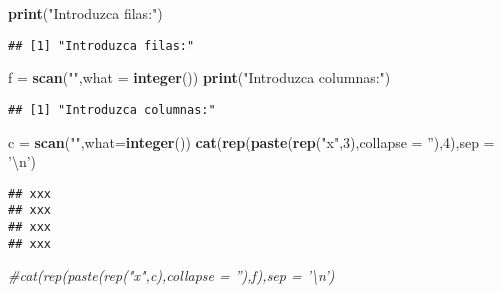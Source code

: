 \documentclass[]{article}
\newenvironment{Shaded}{\begin{snugshade}}{\end{snugshade}}
\newcommand{\KeywordTok}[1]{\textcolor[rgb]{0.13,0.29,0.53}{\textbf{#1}}}
\newcommand{\DataTypeTok}[1]{\textcolor[rgb]{0.13,0.29,0.53}{#1}}
\newcommand{\DecValTok}[1]{\textcolor[rgb]{0.00,0.00,0.81}{#1}}
\newcommand{\CharTok}[1]{\textcolor[rgb]{0.31,0.60,0.02}{#1}}
\newcommand{\StringTok}[1]{\textcolor[rgb]{0.31,0.60,0.02}{#1}}
\newcommand{\CommentTok}[1]{\textcolor[rgb]{0.56,0.35,0.01}{\textit{#1}}}
\newcommand{\NormalTok}[1]{#1}
\begin{document}
\begin{Shaded}
\begin{Highlighting}[]
\KeywordTok{print}\NormalTok{(}\StringTok{"Introduzca filas:"}\NormalTok{)}
\end{Highlighting}
\end{Shaded}

\begin{verbatim}
## [1] "Introduzca filas:"
\end{verbatim}

\begin{Shaded}
\begin{Highlighting}[]
\NormalTok{f =}\StringTok{ }\KeywordTok{scan}\NormalTok{(}\StringTok{""}\NormalTok{,}\DataTypeTok{what =} \KeywordTok{integer}\NormalTok{())}
\KeywordTok{print}\NormalTok{(}\StringTok{"Introduzca columnas:"}\NormalTok{)}
\end{Highlighting}
\end{Shaded}

\begin{verbatim}
## [1] "Introduzca columnas:"
\end{verbatim}

\begin{Shaded}
\begin{Highlighting}[]
\NormalTok{c =}\StringTok{ }\KeywordTok{scan}\NormalTok{(}\StringTok{""}\NormalTok{,}\DataTypeTok{what=}\KeywordTok{integer}\NormalTok{())}
\KeywordTok{cat}\NormalTok{(}\KeywordTok{rep}\NormalTok{(}\KeywordTok{paste}\NormalTok{(}\KeywordTok{rep}\NormalTok{(}\StringTok{"x"}\NormalTok{,}\DecValTok{3}\NormalTok{),}\DataTypeTok{collapse =} \StringTok{''}\NormalTok{),}\DecValTok{4}\NormalTok{),}\DataTypeTok{sep =} \StringTok{'}\CharTok{\textbackslash{}n}\StringTok{'}\NormalTok{)}
\end{Highlighting}
\end{Shaded}

\begin{verbatim}
## xxx
## xxx
## xxx
## xxx
\end{verbatim}

\begin{Shaded}
\begin{Highlighting}[]
\CommentTok{#cat(rep(paste(rep("x",c),collapse = ''),f),sep = '\textbackslash{}n')}
\end{Highlighting}
\end{Shaded}
\end{document}

